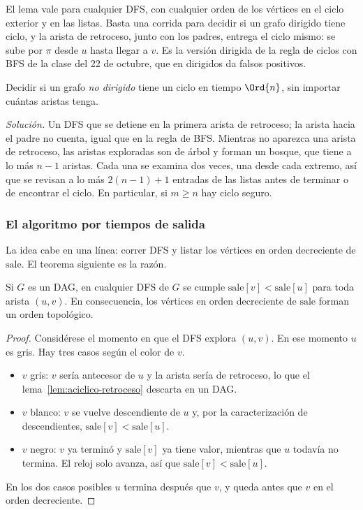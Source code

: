 \documentclass[11pt,letterpaper]{article}
\begin{document}
El lema vale para cualquier DFS, con cualquier orden de los vértices en
el ciclo exterior y en las listas. Basta una corrida para decidir si un
grafo dirigido tiene ciclo, y la arista de retroceso, junto con los
padres, entrega el ciclo mismo: se sube por $\pi$ desde $u$ hasta
llegar a $v$. Es la versión dirigida de la regla de ciclos con BFS de
la clase del 22 de octubre, que en dirigidos da falsos positivos.

\begin{ejercicio}
  Decidir si un grafo \emph{no dirigido} tiene un ciclo en tiempo
  $\Ord{n}$, sin importar cuántas aristas tenga.

  \textit{Solución.} Un DFS que se detiene en la primera arista de
  retroceso; la arista hacia el padre no cuenta, igual que en la regla
  de BFS. Mientras no aparezca una arista de retroceso, las aristas
  exploradas son de árbol y forman un bosque, que tiene a lo más
  $n - 1$ aristas. Cada una se examina dos veces, una desde cada
  extremo, así que se revisan a lo más $2(n - 1) + 1$ entradas de las
  listas antes de terminar o de encontrar el ciclo. En particular, si
  $m \ge n$ hay ciclo seguro.
\end{ejercicio}

\subsubsection*{El algoritmo por tiempos de salida}

La idea cabe en una línea: correr DFS y listar los vértices en orden
decreciente de $\text{sale}$. El teorema siguiente es la razón.

\begin{teorema}
  \label{teo:topologico-salida}
  Si $G$ es un DAG, en cualquier DFS de $G$ se cumple
  $\text{sale}[v] < \text{sale}[u]$ para toda arista $(u, v)$. En
  consecuencia, los vértices en orden decreciente de $\text{sale}$
  forman un orden topológico.
\end{teorema}

\begin{proof}
  Considérese el momento en que el DFS explora $(u, v)$. En ese momento
  $u$ es gris. Hay tres casos según el color de $v$.
  \begin{itemize}[itemsep=0.1em]
    \item $v$ gris: $v$ sería antecesor de $u$ y la arista sería de
          retroceso, lo que el lema~\ref{lem:aciclico-retroceso}
          descarta en un DAG.
    \item $v$ blanco: $v$ se vuelve descendiente de $u$ y, por la
          caracterización de descendientes,
          $\text{sale}[v] < \text{sale}[u]$.
    \item $v$ negro: $v$ ya terminó y $\text{sale}[v]$ ya tiene valor,
          mientras que $u$ todavía no termina. El reloj solo avanza,
          así que $\text{sale}[v] < \text{sale}[u]$.
  \end{itemize}
  En los dos casos posibles $u$ termina después que $v$, y queda antes
  que $v$ en el orden decreciente.
\end{proof}
\end{document}
